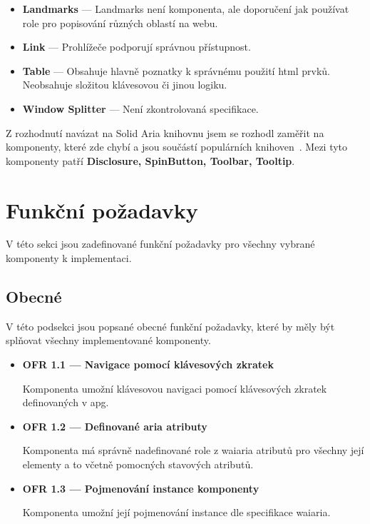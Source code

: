 \begin{itemize}
      \item \textbf{Landmarks} --- Landmarks není komponenta, ale doporučení jak používat role pro popisování různých oblastí na webu.
      \item \textbf{Link} --- Prohlížeče podporují správnou přístupnost.
      \item \textbf{Table} --- Obsahuje hlavně poznatky k správnému použití \gls{html} prvků. Neobsahuje složitou klávesovou či jinou logiku.
      \item \textbf{Window Splitter} --- Není zkontrolovaná specifikace.
\end{itemize}

Z rozhodnutí navázat na Solid Aria knihovnu jsem se rozhodl zaměřit na komponenty, které zde chybí a jsou součástí populárních knihoven~\cite{react-aria,chakra}.
Mezi tyto komponenty patří \textbf{Disclosure, SpinButton, Toolbar, Tooltip}.

\section{Funkční požadavky}

V této sekci jsou zadefinované funkční požadavky pro všechny vybrané komponenty k implementaci.

\subsection{Obecné}

V této podsekci jsou popsané obecné funkční požadavky, které by měly být splňovat všechny implementované komponenty.

\begin{itemize}
      \item \textbf{OFR 1.1 --- Navigace pomocí klávesových zkratek}\label{ofr11}

            Komponenta umožní klávesovou navigaci pomocí klávesových zkratek definovaných v \gls{apg}.

      \item \textbf{OFR 1.2 --- Definované aria atributy}\label{ofr12}

            Komponenta má správně nadefinované role z \gls{waiaria} atributů pro všechny její elementy a to včetně pomocných stavových atributů.

      \item \textbf{OFR 1.3 --- Pojmenování instance komponenty}\label{ofr13}

            Komponenta umožní její pojmenování instance dle specifikace \gls{waiaria}.
\end{itemize}

